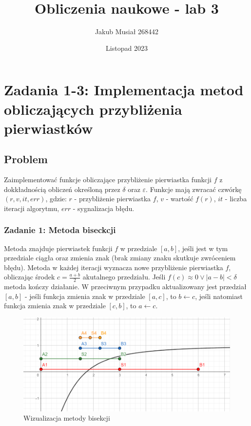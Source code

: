\documentclass[11pt]{article}
\title{Obliczenia naukowe - lab 3}
\author{Jakub Musiał 268442}
\date{Listopad 2023}
\begin{document}
\maketitle

\hspace{1cm}

\section*{Zadania 1-3: Implementacja metod obliczających przybliżenia pierwiastków}
    \subsection*{Problem}
        Zaimplementować funkcje obliczające przybliżenie pierwiastka funkcji $f$ 
        z dokkładnością obliczeń określoną przez $\delta$ oraz $\varepsilon$.
        \newline
        Funkcje mają zwracać czwórkę $(r, v, it, err)$, gdzie: $r$ - przybliżenie pierwiastka $f$, 
        $v$ - wartość $f(r)$, $it$ - liczba iteracji algorytmu, $err$ - sygnalizacja błędu.

        \subsubsection*{Zadanie 1: Metoda biseckcji}
            Metoda znajduje pierwiastek funkcji $f$ w przedziale $[a, b]$, jeśli jest w tym przedziale ciągła
            oraz zmienia znak (brak zmiany znaku skutkuje zwróceniem błędu). Metoda w każdej iteracji wyznacza 
            nowe przybliżenie pierwiastka $f$, obliczając środek $c = \frac{a + b}{2}$ akutalnego przedziału. 
            Jeśli $f(c) \approx 0 \lor |a - b| < \delta$ metoda kończy działanie. W przeciwnym przypadku
            aktualizowany jest przedział $[a, b]$ - jeśli funkcja zmienia znak w przedziale $[a, c]$, to $b \gets c$,
            jeśli natomiast funkcja zmienia znak w przedziale $[c, b]$, to $a \gets c$. 
            \newline
            \begin{figure}[h]
                \centering
                \includegraphics[scale=0.6]{img/bisection.png}
                \caption{Wizualizacja metody bisekcji}
                \label{fig:bisection}
            \end{figure}
\end{document}
